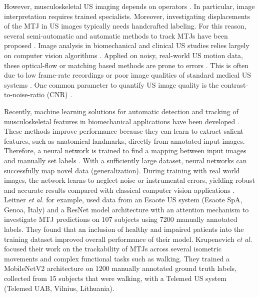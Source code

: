 \documentclass[journal,twoside,web]{ieeecolor}
\begin{document}
However, musculoskeletal US imaging depends on operators \cite{j:Ohrndorf2010}. In particular, image interpretation requires trained specialists. Moreover, investigating displacements of the MTJ in US images typically needs handcrafted labeling. For this reason, several semi-automatic and automatic methods to track MTJs have been proposed \cite{j:Lee2008,j:Zhou2018,j:Cenni2019,j:Kharazi2020}. Image analysis in biomechanical and clinical US studies relies largely on computer vision algorithms \cite{j:Hooren2020}. Applied on noisy, real-world US motion data, these optical-flow or matching based methods are prone to errors \cite{proc:Sukhwan2001}. This is often due to low frame-rate recordings or poor image qualities of standard medical US systems \cite{j:Leitner2019}. One common parameter to quantify US image quality is the contrast-to-noise-ratio (CNR) \cite{j:Ng2011}.

Recently, machine learning solutions for automatic detection and tracking of musculoskeletal features in biomechanical applications have been developed \cite{j:Cronin2020}. These methods improve performance because they can learn to extract salient features, such as anatomical landmarks, directly from annotated input images. Therefore, a neural network is trained to find a mapping between input images and manually set labels \cite{Goodfellow-et-al-2016, lecun2015deep}. With a sufficiently large dataset, neural networks can successfully map novel data (generalization). During training with real world images, the network learns to neglect noise or instrumental errors, yielding robust and accurate results compared with classical computer vision applications \cite{c:Englmair2020}. Leitner \textit{et al.} \cite{c:LeitnerJarolim2020} for example, used data from an Esaote US system (Esaote SpA, Genoa, Italy) and a ResNet model architecture \cite{c:He2016} with an attention mechanism \cite{j:Jetley2018} to investigate MTJ predictions on 107 subjects using 7200 manually annotated labels. They found that an inclusion of healthy and impaired patients into the training dataset improved overall performance of their model. Krupenevich \textit{et al.} \cite{j:Krupenevich2021} focused their work on the trackability of MTJs across several isometric movements and complex functional tasks such as walking. They trained a MobileNetV2 \cite{c:Sandler2018} architecture on 1200 manually annotated ground truth labels, collected from 15 subjects that were walking, with a Telemed US system (Telemed UAB, Vilnius, Lithuania). 
\end{document}
